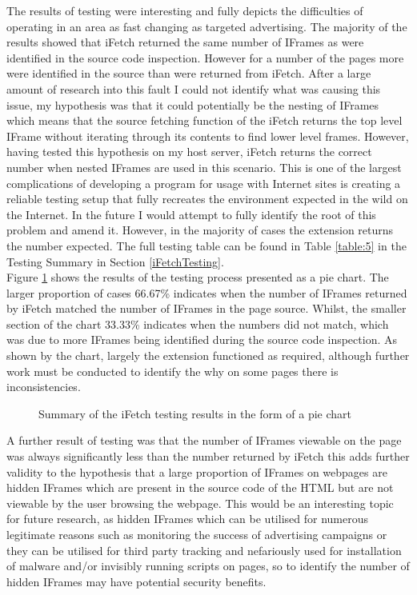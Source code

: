 \documentclass[12pt]{article}
\begin{document}
The results of testing were interesting and fully depicts the difficulties of operating in an area as fast changing as targeted advertising. The majority of the results showed that iFetch returned the same number of IFrames as were identified in the source code inspection. However for a number of the pages more were identified in the source than were returned from iFetch. After a large amount of research into this fault I could not identify what was causing this issue, my hypothesis was that it could potentially be the nesting of IFrames which means that the source fetching function of the iFetch returns the top level IFrame without iterating through its contents to find lower level frames. However, having tested this hypothesis on my host server, iFetch returns the correct number when nested IFrames are used in this scenario. This is one of the largest complications of developing a program for usage with Internet sites is creating a reliable testing setup that fully recreates the environment expected in the wild on the Internet. In the future I would attempt to fully identify the root of this problem and amend it. However, in the majority of cases the extension returns the number expected. The full testing table can be found in Table \ref{table:5} in the Testing Summary in Section \ref{iFetchTesting}. \\

Figure \ref{fig:ifPie} shows the results of the testing process presented as a pie chart. The larger proportion of cases 66.67\% indicates when the number of IFrames returned by iFetch matched the number of IFrames in the page source. Whilst, the smaller section of the chart 33.33\% indicates when the numbers did not match, which was due to more IFrames being identified during the source code inspection. As shown by the chart, largely the extension functioned as required, although further work must be conducted to identify the why on some pages there is inconsistencies.  

\begin{figure} [H]
    \centering
        \caption{Summary of the iFetch testing results in the form of a pie chart}
        \label{fig:ifPie}
\end{figure}

A further result of testing was that the number of IFrames viewable on the page was always significantly less than the number returned by iFetch this adds further validity to the hypothesis that a large proportion of IFrames on webpages are hidden IFrames which are present in the source code of the HTML but are not viewable by the user browsing the webpage. This would be an interesting topic for future research, as hidden IFrames which can be utilised for numerous legitimate reasons such as monitoring the success of advertising campaigns or they can be utilised for third party tracking and nefariously used for installation of malware and/or invisibly running scripts on pages, so to identify the number of hidden IFrames may have potential security benefits. 
\end{document}
